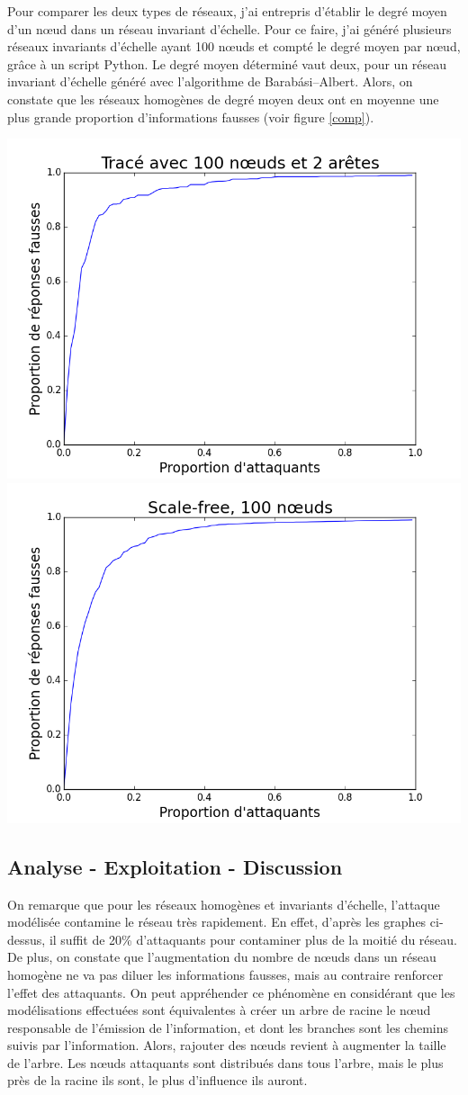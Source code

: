 \documentclass[12pt,a4paper]{article}
\begin{document}
Pour comparer les deux types de réseaux, j'ai entrepris d'établir le degré moyen d'un nœud dans un réseau invariant d'échelle.
Pour ce faire, j'ai généré plusieurs réseaux invariants d'échelle ayant 100 nœuds et compté le degré moyen par nœud, grâce à un script Python.
Le degré moyen déterminé vaut deux, pour un réseau invariant d'échelle généré avec l'algorithme de Barabási–Albert.
Alors, on constate que les réseaux homogènes de degré moyen deux ont en moyenne une plus grande proportion d'informations fausses (voir figure \ref{comp}).


\begin{center}
\includegraphics[width=0.49\linewidth]{../resultats/atkaleat/atkaleat-100-2-1.png}
\includegraphics[width=0.49\linewidth]{../resultats/scale-free/sf-t1-n100-1-it100.png}
 \label{comp}
\end{center}
	



\subsection{Analyse - Exploitation - Discussion} %

On remarque que pour les réseaux homogènes et invariants d'échelle, l'attaque modélisée contamine le réseau très rapidement.
En effet, d'après les graphes ci-dessus, il suffit de 20\% d'attaquants pour contaminer plus de la moitié du réseau.
De plus, on constate que l'augmentation du nombre de nœuds dans un réseau homogène ne va pas diluer les informations fausses, mais au contraire renforcer l'effet des attaquants.
On peut appréhender ce phénomène en considérant que les modélisations effectuées sont équivalentes à créer un arbre de racine le nœud responsable de l'émission de l'information, et dont les branches sont les chemins suivis par l'information.
Alors, rajouter des nœuds revient à augmenter la taille de l'arbre.
Les nœuds attaquants sont distribués dans tous l'arbre, mais le plus près de la racine ils sont, le plus d'influence ils auront.
\end{document}

